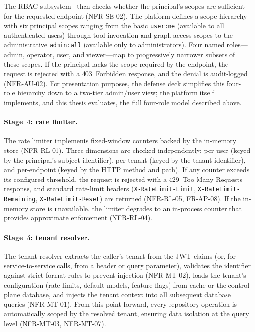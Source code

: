 \documentclass[a4paper,noexaminfo]{sapthesis}
\begin{document}
The RBAC subsystem~\cite{nist2004rbac} then checks whether the
principal's scopes are sufficient for the requested endpoint
(NFR-SE-02).  The platform defines a scope hierarchy with six principal
scopes ranging from the basic
\texttt{user:me} (available to all authenticated users) through
tool-invocation and graph-access scopes to the administrative
\texttt{admin:all} (available only to administrators).  Four named
roles---admin, operator, user, and viewer---map to progressively
narrower subsets of these scopes.  If the principal lacks the scope
required by the endpoint, the request is rejected with a 403~Forbidden
response, and the denial is audit-logged (NFR-AU-02).  For presentation
purposes, the defense deck simplifies this four-role hierarchy down to a
two-tier admin/user view; the platform itself implements, and this
thesis evaluates, the full four-role model described above.

\paragraph{Stage~4: rate limiter.}
The rate limiter implements fixed-window counters backed by the in-memory
store (NFR-RL-01).  Three dimensions are checked independently: per-user
(keyed by the principal's subject identifier), per-tenant (keyed by the
tenant identifier), and per-endpoint (keyed by the HTTP method and path).
If any counter exceeds its configured threshold, the request is rejected
with a 429~Too Many Requests response, and standard rate-limit headers
(\texttt{X-RateLimit-Limit}, \texttt{X-RateLimit-Remaining},
\texttt{X-RateLimit-Reset}) are returned (NFR-RL-05, FR-AP-08).  If the
in-memory store is unavailable, the limiter degrades to an in-process
counter that provides approximate enforcement (NFR-RL-04).

\paragraph{Stage~5: tenant resolver.}
The tenant resolver extracts the caller's tenant from the JWT claims
(or, for service-to-service calls, from a header or query parameter),
validates the identifier against strict format rules to prevent injection
(NFR-MT-02), loads the tenant's configuration (rate limits, default
models, feature flags) from cache or the control-plane database, and
injects the tenant context into all subsequent database queries
(NFR-MT-01).  From this point forward, every repository operation is
automatically scoped by the resolved tenant, ensuring data isolation at
the query level (NFR-MT-03, NFR-MT-07).
\end{document}
